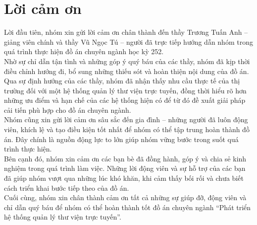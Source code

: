 \section*{Lời cảm ơn}
\thispagestyle{empty}

Lời đầu tiên, nhóm xin gửi lời cảm ơn chân thành đến thầy Trương Tuấn Anh – giảng viên chính và thầy Vũ Ngọc Tú – người đã trực tiếp hướng dẫn nhóm trong quá trình thực hiện đồ án chuyên ngành học kỳ 252.\\
Nhờ sự chỉ dẫn tận tình và những góp ý quý báu của các thầy, nhóm đã kịp thời điều chỉnh hướng đi, bổ sung những thiếu sót và hoàn thiện nội dung của đồ án. Qua sự định hướng của các thầy, nhóm đã nhận thấy nhu cầu thực tế của thị trường đối với một hệ thống quản lý thư viện trực tuyến, đồng thời hiểu rõ hơn những ưu điểm và hạn chế của các hệ thống hiện có để từ đó đề xuất giải pháp cải tiến phù hợp cho đồ án chuyên ngành.\\
Nhóm cũng xin gửi lời cảm ơn sâu sắc đến gia đình – những người đã luôn động viên, khích lệ và tạo điều kiện tốt nhất để nhóm có thể tập trung hoàn thành đồ án. Đây chính là nguồn động lực to lớn giúp nhóm vững bước trong suốt quá trình thực hiện.\\
Bên cạnh đó, nhóm xin cảm ơn các bạn bè đã đồng hành, góp ý và chia sẻ kinh nghiệm trong quá trình làm việc. Những lời động viên và sự hỗ trợ của các bạn đã giúp nhóm vượt qua những lúc khó khăn, khi cảm thấy bối rối và chưa biết cách triển khai bước tiếp theo của đồ án.\\
Cuối cùng, nhóm xin chân thành cảm ơn tất cả những sự giúp đỡ, động viên và chỉ dẫn quý báu để nhóm có thể hoàn thành tốt đồ án chuyên ngành “Phát triển hệ thống quản lý thư viện trực tuyến”.


\clearpage
{}
